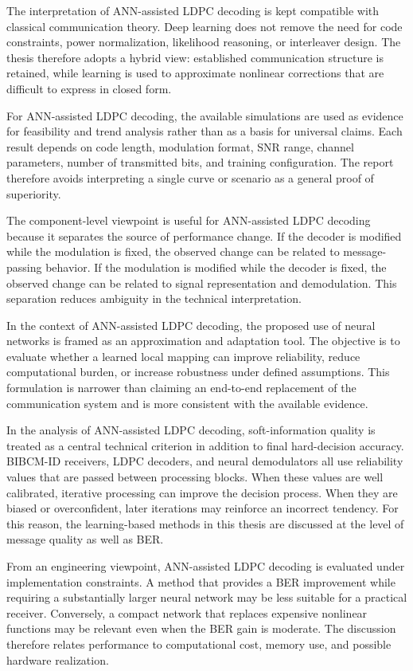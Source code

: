 The interpretation of ANN-assisted LDPC decoding is kept compatible with classical communication theory. Deep learning does not remove the need for code constraints, power normalization, likelihood reasoning, or interleaver design. The thesis therefore adopts a hybrid view: established communication structure is retained, while learning is used to approximate nonlinear corrections that are difficult to express in closed form.

For ANN-assisted LDPC decoding, the available simulations are used as evidence for feasibility and trend analysis rather than as a basis for universal claims. Each result depends on code length, modulation format, SNR range, channel parameters, number of transmitted bits, and training configuration. The report therefore avoids interpreting a single curve or scenario as a general proof of superiority.

The component-level viewpoint is useful for ANN-assisted LDPC decoding because it separates the source of performance change. If the decoder is modified while the modulation is fixed, the observed change can be related to message-passing behavior. If the modulation is modified while the decoder is fixed, the observed change can be related to signal representation and demodulation. This separation reduces ambiguity in the technical interpretation.

In the context of ANN-assisted LDPC decoding, the proposed use of neural networks is framed as an approximation and adaptation tool. The objective is to evaluate whether a learned local mapping can improve reliability, reduce computational burden, or increase robustness under defined assumptions. This formulation is narrower than claiming an end-to-end replacement of the communication system and is more consistent with the available evidence.

In the analysis of ANN-assisted LDPC decoding, soft-information quality is treated as a central technical criterion in addition to final hard-decision accuracy. BIBCM-ID receivers, LDPC decoders, and neural demodulators all use reliability values that are passed between processing blocks. When these values are well calibrated, iterative processing can improve the decision process. When they are biased or overconfident, later iterations may reinforce an incorrect tendency. For this reason, the learning-based methods in this thesis are discussed at the level of message quality as well as BER.

From an engineering viewpoint, ANN-assisted LDPC decoding is evaluated under implementation constraints. A method that provides a BER improvement while requiring a substantially larger neural network may be less suitable for a practical receiver. Conversely, a compact network that replaces expensive nonlinear functions may be relevant even when the BER gain is moderate. The discussion therefore relates performance to computational cost, memory use, and possible hardware realization.

